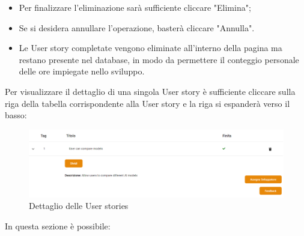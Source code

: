 \documentclass{article}
\begin{document}
    \begin{itemize}
        \item Per finalizzare l'eliminazione sarà sufficiente cliccare "Elimina";
        \item Se si desidera annullare l'operazione, basterà cliccare "Annulla".
        \item Le User story completate vengono eliminate all'interno della pagina ma restano presente nel database, in modo da permettere il conteggio personale delle ore impiegate nello sviluppo.
    \end{itemize}
Per visualizzare il dettaglio di una singola User story è sufficiente cliccare sulla riga della tabella corrispondente alla User story e la riga si espanderà verso il basso:
    \begin{figure}[H]
      \centering
      \includegraphics[width=\textwidth]{documenti/Screenshot manuale utente/dett us.png}
      \caption{Dettaglio delle User stories}
      \label{dettaglio user}
    \end{figure}
In questa sezione è possibile:
\end{document}
